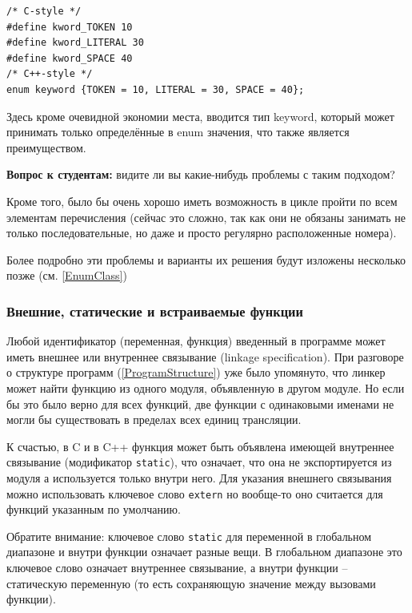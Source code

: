 \documentclass[a4paper,12pt,oneside]{article}
\newif\ifanswers
\begin{document}
\begin{lstlisting}
/* C-style */
#define kword_TOKEN 10
#define kword_LITERAL 30
#define kword_SPACE 40
/* C++-style */
enum keyword {TOKEN = 10, LITERAL = 30, SPACE = 40};
\end{lstlisting}

Здесь кроме очевидной экономии места, вводится тип keyword, который может принимать только определённые в enum значения, что также является преимуществом.

\textbf{Вопрос к студентам:} видите ли вы какие-нибудь проблемы с таким подходом?

\ifanswers
Возможный ответ: да, символьное имя \lstinline!TOKEN! может конфликтовать с другим перечислением.
\fi

Кроме того, было бы очень хорошо иметь возможность в цикле пройти по всем элементам перечисления (сейчас это сложно, так как они не обязаны занимать не только последовательные, но даже и просто регулярно расположенные номера).

Более подробно эти проблемы и варианты их решения будут изложены несколько позже (см. \ref{EnumClass})

\subsubsection{Внешние, статические и встраиваемые функции}\label{Inline}

Любой идентификатор (переменная, функция) введенный в программе может иметь внешнее или внутреннее связывание (linkage specification). При разговоре о структуре программ (\ref{ProgramStructure}) уже было упомянуто, что линкер может найти функцию из одного модуля, объявленную в другом модуле. Но если бы это было верно для всех функций, две функции с одинаковыми именами не могли бы существовать в пределах всех единиц трансляции. 

К счастью, в C и в C++ функция может быть объявлена имеющей внутреннее связывание (модификатор \lstinline!static!), что означает, что она не экспортируется из модуля а используется только внутри него. Для указания внешнего связывания можно использовать ключевое слово \lstinline!extern! но вообще-то оно считается для функций указанным по умолчанию.

Обратите внимание: ключевое слово \lstinline!static! для переменной в глобальном диапазоне и внутри функции означает разные вещи. В глобальном диапазоне это ключевое слово означает внутреннее связывание, а внутри функции -- статическую переменную (то есть сохраняющую значение между вызовами функции).
\end{document}
